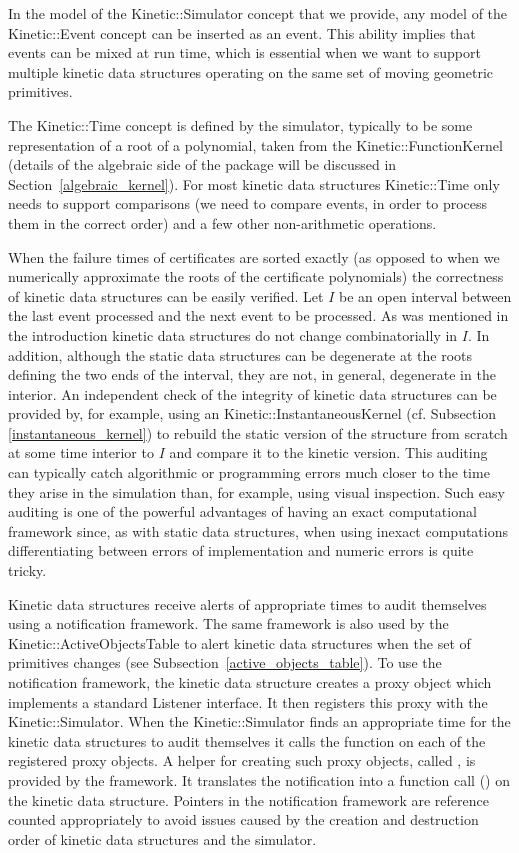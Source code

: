 In the model of the Kinetic::Simulator concept that we provide, any
model of the Kinetic::Event concept can be inserted as an event. This
ability implies that events can be mixed at run time, which is
essential when we want to support multiple kinetic data structures
operating on the same set of moving geometric primitives.

The Kinetic::Time concept is defined by the simulator, typically to be
some representation of a root of a polynomial, taken from the
Kinetic::FunctionKernel (details of the algebraic side of the package
will be discussed in Section~\ref{algebraic_kernel}). For most
kinetic data structures Kinetic::Time only needs to support
comparisons (we need to compare events, in order to process them in
the correct order) and a few other non-arithmetic operations.

When the failure times of certificates are sorted exactly (as opposed
to when we numerically approximate the roots of the certificate
polynomials) the correctness of kinetic data structures can be easily
verified.  Let $I$ be an open interval between the last event
processed and the next event to be processed.  As was mentioned in the
introduction kinetic data structures do not change combinatorially in
$I$. In addition, although the static data structures can be
degenerate at the roots defining the two ends of the interval, they
are not, in general, degenerate in the interior. An independent check
of the integrity of kinetic data structures can be provided by, for
example, using an Kinetic::InstantaneousKernel (cf. Subsection
\ref{instantaneous_kernel}) to rebuild the static version of the
structure from scratch at some time interior to $I$ and compare it to
the kinetic version. This auditing can typically catch algorithmic or
programming errors much closer to the time they arise in the
simulation than, for example, using visual inspection.  Such easy
auditing is one of the powerful advantages of having an exact
computational framework since, as with static data structures, when
using inexact computations differentiating between errors of
implementation and numeric errors is quite tricky.

Kinetic data structures receive alerts of appropriate times to audit
themselves using a notification framework. The same framework is also
used by the Kinetic::ActiveObjectsTable to alert kinetic data
structures when the set of primitives changes (see
Subsection~\ref{active_objects_table}). To use the notification
framework, the kinetic data structure creates a proxy object which
implements a standard Listener interface. It then registers
this proxy with the Kinetic::Simulator. When the Kinetic::Simulator
finds an appropriate time for the kinetic data structures to audit
themselves it calls the function
 on each of the registered
proxy objects.  A helper for creating such proxy objects, called
, is provided by the framework. It
translates the notification into a function call () on
the kinetic data structure.  Pointers in the notification framework
are reference counted appropriately to avoid issues caused by the
creation and destruction order of kinetic data structures and the
simulator.


